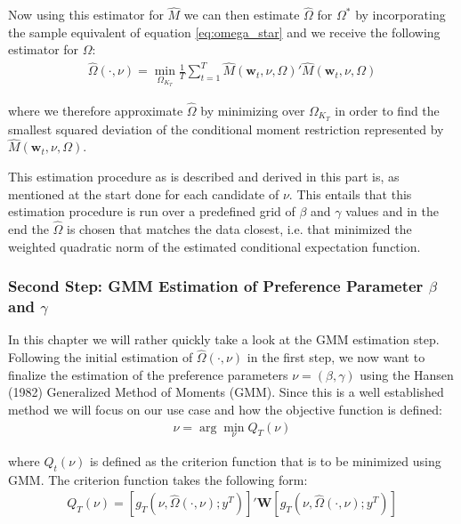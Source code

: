\documentclass[12pt,a4paper]{article}
\begin{document}
		Now using this estimator for $\hat{M}$ we can then estimate $\hat{\Omega}$ for $\Omega^*$ by incorporating the sample equivalent of equation \ref{eq:omega_star} and we receive the following estimator for $\Omega$:
		\begin{align}
			\hat{\Omega}(\cdot, \nu) = \underset{\Omega_{K_T}}{\min} \frac{1}{T} \sum_{t = 1}^{T} \hat{M}(\textbf{w}_t, \nu, \Omega)' \hat{M}(\textbf{w}_t, \nu, \Omega)
		\end{align}
		
		where we therefore approximate $\hat{\Omega}$ by minimizing over $\Omega_{K_T}$ in order to find the smallest squared deviation of the conditional moment restriction represented by $\hat{M}(\textbf{w}_t, \nu, \Omega)$. 
		
		
		This estimation procedure as is described and derived in this part is, as mentioned at the start done for each candidate of $\nu$. This entails that this estimation procedure is run over a predefined grid of $\beta$  and $\gamma$ values and in the end the $\hat{\Omega}$ is chosen that matches the data closest, i.e. that minimized the weighted quadratic norm of the estimated conditional expectation function.
	
	

		
		\subsubsection{Second Step: GMM Estimation of Preference Parameter $\beta$ and $\gamma$}
	
		In this chapter we will rather quickly take a look at the GMM estimation step. Following the initial estimation of $\hat{\Omega}(\cdot, \nu)$ in the first step, we now want to finalize the estimation of the preference parameters $\nu = (\beta, \gamma)$ using the Hansen (1982) Generalized Method of Moments (GMM). 
		Since this is a well established method we will focus on our use case and how the objective function is defined:
		\begin{align}
			\hat{\nu} = \arg \underset{\nu}{\min} Q_T(\nu)
			\label{eq:objective_func_nu}
		\end{align}
		
		where $Q_t(\nu)$ is defined as the criterion function that is to be minimized using GMM. The criterion function takes the following form:
		\begin{align}
			Q_T(\nu) = \left[ g_T \left( \nu, \hat{\Omega}(\cdot, \nu); y^T \right) \right]' \textbf{W} \left[ g_T \left( \nu, \hat{\Omega}(\cdot, \nu); y^T \right) \right]
			\label{eq:objective_func_gmm}
		\end{align}
		
\end{document}
